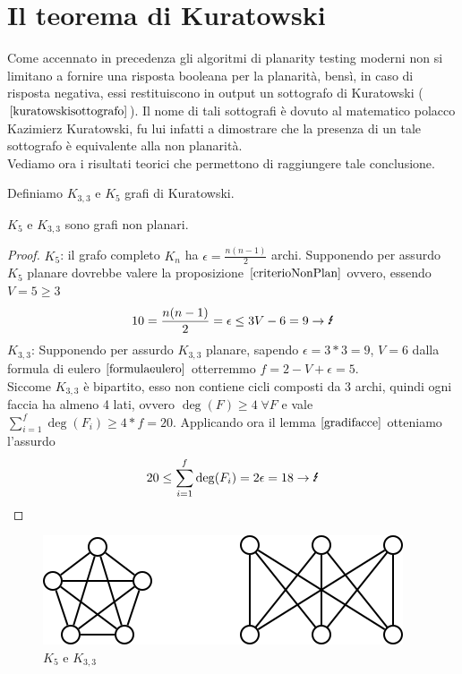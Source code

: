 \section{Il teorema di Kuratowski}
Come accennato in precedenza gli algoritmi di planarity testing moderni non si limitano a fornire una risposta booleana per la planarità, bensì, in caso di risposta negativa, essi restituiscono in output un sottografo di Kuratowski (\(\ref{kuratowskisottografo}\)). Il nome di tali sottografi è dovuto al matematico polacco Kazimierz Kuratowski, fu lui infatti a dimostrare che la presenza di un tale sottografo è equivalente alla non planarità.
\\ Vediamo ora i risultati teorici che permettono di raggiungere tale conclusione.
\begin{definizione}\label{kuratowskisottografo}
    Definiamo \(K_{3,3}\) e \(K_5\) grafi di Kuratowski.
\end{definizione}
\begin{lemma}\label{k5k33nonplanari}
    \(K_5\) e \(K_{3,3}\) sono grafi non planari.
    \begin{proof}
        \underline{\(K_5\)}: il grafo completo \(K_n\) ha \(\epsilon=\frac{n(n-1)}{2}\) archi. Supponendo per assurdo \(K_5\) planare dovrebbe valere la proposizione \(\ref{criterioNonPlan}\) ovvero, essendo \(V=5 \geq 3\)
        \begin{equation}
            10 = \frac{n(n-1)}{2} = \epsilon \leq 3V-6 = 9 \rightarrow \text{\Lightning}
        \end{equation}
        \underline{\(K_{3,3}\)}: Supponendo per assurdo \(K_{3,3}\) planare, sapendo \(\epsilon=3*3=9\), \(V=6\) dalla formula di eulero \(\ref{formulaeulero}\) otterremmo \(f=2-V+\epsilon=5\). \\
        Siccome \(K_{3,3}\) è bipartito, esso non contiene cicli composti da 3 archi, quindi ogni faccia ha almeno 4 lati, ovvero \(\deg(F)\geq 4 \;\forall F\) e vale \(\sum_{i=1}^{f} \deg(F_i) \geq 4*f = 20\). Applicando ora il lemma \(\ref{gradifacce}\) otteniamo l'assurdo
        \begin{equation}
            20 \leq \sum_{i=1}^{f} \deg(F_i) = 2\epsilon = 18 \rightarrow\text{\Lightning}
        \end{equation} 
    \end{proof}
    \begin{figure}[H]
        \centering
        \includegraphics[scale=0.6]{img/k533.PNG}
        \caption{\(K_5\) e \(K_{3,3}\)}
    \end{figure} 
\end{lemma}
